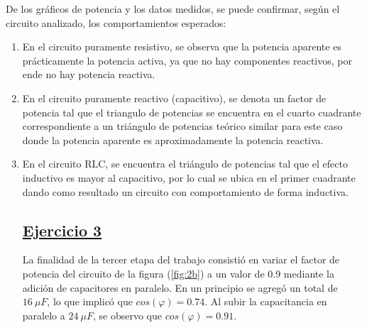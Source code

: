 \documentclass[a4paper]{article}
\begin{document}
 De los gráficos de potencia y los datos medidos, se puede confirmar, según el circuito analizado, los comportamientos esperados: 
\begin{enumerate}

	\item En el circuito puramente resistivo, se observa que la potencia aparente es prácticamente la potencia activa, ya que no hay componentes reactivos, por ende no hay potencia reactiva. 
 
	\item En el circuito puramente reactivo (capacitivo), se denota un factor de potencia tal que el triangulo de potencias se encuentra en el cuarto cuadrante correspondiente a un triángulo de potencias teórico similar para este caso donde la potencia aparente es aproximadamente la potencia reactiva.
 
	\item En el circuito RLC, se encuentra el triángulo de potencias tal que el efecto inductivo es mayor al capacitivo, por lo cual se ubica en el primer cuadrante dando como resultado un circuito con comportamiento de forma inductiva. 
	
\subsection*{\underline{Ejercicio 3}}
La finalidad de la tercer etapa del trabajo consistió en variar el factor de potencia del circuito de la figura (\ref{fig:2b}) a un valor de $ 0.9 $ mediante la adición de capacitores en paralelo. En un principio se agregó un total de $ 16 \ \mu F$, lo que implicó que $ cos \left(\varphi \right) = 0.74 $. Al subir la capacitancia en paralelo a $ 24 \ \mu F$, se observo que $ cos \left(\varphi \right) = 0.91 $.
\end{enumerate}
\end{document}
